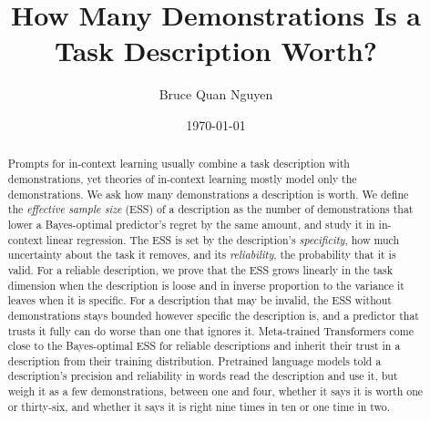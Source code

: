 \documentclass[10pt,twocolumn]{article}
\title{How Many Demonstrations Is a Task Description Worth?}
\author{Bruce Quan Nguyen}
\date{\today}
\begin{document}
\maketitle

\begin{abstract}
Prompts for in-context learning usually combine a task description with demonstrations, yet theories of in-context learning mostly model only the demonstrations. We ask how many demonstrations a description is worth. We define the \emph{effective sample size} (ESS) of a description as the number of demonstrations that lower a Bayes-optimal predictor's regret by the same amount, and study it in in-context linear regression. The ESS is set by the description's \emph{specificity}, how much uncertainty about the task it removes, and its \emph{reliability}, the probability that it is valid. For a reliable description, we prove that the ESS grows linearly in the task dimension when the description is loose and in inverse proportion to the variance it leaves when it is specific. For a description that may be invalid, the ESS without demonstrations stays bounded however specific the description is, and a predictor that trusts it fully can do worse than one that ignores it. Meta-trained Transformers come close to the Bayes-optimal ESS for reliable descriptions and inherit their trust in a description from their training distribution. Pretrained language models told a description's precision and reliability in words read the description and use it, but weigh it as a few demonstrations, between one and four, whether it says it is worth one or thirty-six, and whether it says it is right nine times in ten or one time in two.
\end{abstract}
\end{document}
